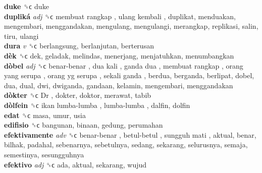 \textbf{duke} ␝ϲ  duke  \\
\textbf{dupliká} \emph{adj}  ␝ϲ   membuat rangkap ,  ulang kembali , duplikat, menduakan, mengembari, menggandakan, mengulang, mengulangi, merangkap, replikasi, salin, tiru, ulangi  \\
\textbf{dura} \emph{v}  ␝ϲ  berlangsung, berlanjutan, berterusan  \\
\textbf{dèk} ␝ϲ  dek, geladak, melindas, menerjang, menjatuhkan, menumbangkan  \\
\textbf{dòbel} \emph{adj}  ␝ϲ   benar-benar ,  dua kali ,  ganda dua ,  membuat rangkap ,  orang yang serupa ,  orang yg serupa ,  sekali ganda , berdua, berganda, berlipat, dobel, dua, dual, dwi, dwiganda, gandaan, kelamin, mengembari, menggandakan  \\
\textbf{dòkter} ␝ϲ   Dr , dokter, doktor, merawat, tabib  \\
\textbf{dòlfein} ␝ϲ   ikan lumba-lumba ,  lumba-lumba , dalfin, dolfin  \\
\textbf{edat} ␝ϲ  masa, umur, usia  \\
\textbf{edifisio} ␝ϲ  bangunan, binaan, gedung, perumahan  \\
\textbf{efektivamente} \emph{adv}  ␝ϲ   benar-benar ,  betul-betul ,  sungguh mati , aktual, benar, bilhak, padahal, sebenarnya, sebetulnya, sedang, sekarang, selurusnya, semaja, semestinya, sesungguhnya  \\
\textbf{efektivo} \emph{adj}  ␝ϲ  ada, aktual, sekarang, wujud  \\
